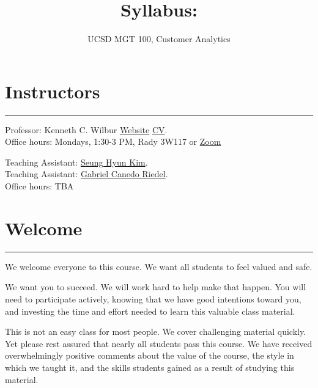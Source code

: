 \documentclass[12pt]{article}
\title{\vspace{-1cm}Syllabus:\vspace{-0.3cm}}
\author{\vspace{-0.5cm}UCSD MGT 100, Customer Analytics}
\begin{document}
\maketitle



\section*{Instructors}
\medskip
\hrule
\medskip


Professor: Kenneth C. Wilbur \textcolor{blue}{\href{http://kennethcwilbur.com/}{Website} \href{https://github.com/kennethcwilbur/website/raw/master/kennethcwilbur_cv.pdf}{CV}}. \\Office hours: Mondays, 1:30-3 PM, Rady 3W117 or \textcolor{blue}{\href{https://ucsd.zoom.us/j/9477848814}{Zoom}}
\vspace{0.2cm}

Teaching Assistant: \textcolor{blue}{\href{https://seunghyun-kim.com/}{Seung Hyun Kim}}.\\
Teaching Assistant: \textcolor{blue}{\href{https://www.linkedin.com/in/gabriel-ca\%C3\%B1edo-riedel-612443147/}{Gabriel Canedo Riedel}}. 
\\Office hours: TBA
\vspace{0.2cm}

\section*{Welcome}
\medskip
\hrule
\medskip
We welcome everyone to this course. We want all students to feel valued and safe. 

We want you to succeed. We will work hard to help make that happen. You will need to participate actively, knowing that we have good intentions toward you, and investing the time and effort needed to learn this valuable class material.

This is not an easy class for most people. We cover challenging material quickly. Yet please rest assured that nearly all students pass this course. We have received overwhelmingly positive comments about the value of the course, the style in which we taught it, and the skills students gained as a result of studying this material.
\end{document}
